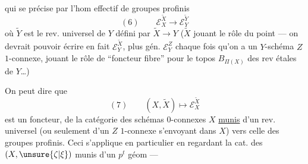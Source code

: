 
qui se précise par l'hom effectif de groupes profinis
\[
(6)\qquad \mathcal E_X^{\widetilde X}\longrightarrow\mathcal E_Y^{\widetilde Y}
\]
où $\widetilde Y$ est le rev. universel de $Y$ défini par $\widetilde X\longrightarrow Y$ ($\widetilde X$ jouant le rôle du point --- on devrait pouvoir écrire en fait $\mathcal E_Y^{\widetilde X}$, plus gén. $\mathcal E_Y^Z$ chaque fois qu'on a un $Y$-schéma $Z$ $1$-connexe, jouant le rôle de ``foncteur fibre'' pour le topos $B_{\Pi(X)}$ des rev étales de $Y$\ldots)


On peut dire que
\[
(7)\qquad (X,\widetilde X)\longmapsto\mathcal E_X^{\widetilde X}
\]
est un foncteur, de la catégorie des schémas $0$-connexes $X$ \uline{munis} d'un rev. universel (ou seulement d'un $Z$ $1$-connexe s'envoyant dans $X$) vers celle des groupes profinis. Ceci s'applique en particulier en regardant la cat. des $(X,\unsure{\zeta|\xi})$ munis d'un $p^t$ géom ---

